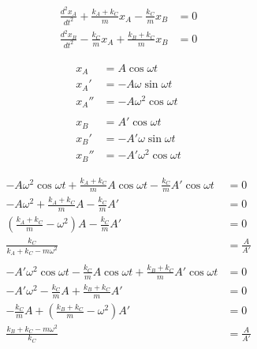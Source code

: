 \documentclass{article}
\begin{document}
\setcounter{subsection}{3}
\subsection{}

\begin{align*}
  \frac{d^2 x_A}{d t^2} + \frac{k_A + k_C}{m} x_A - \frac{k_C}{m} x_B & = 0 \\
  \frac{d^2 x_B}{d t^2} - \frac{k_C}{m} x_A + \frac{k_B + k_C}{m} x_B & = 0
\end{align*}

\begin{align*}
  x_A   & = A \cos \omega t            \\
  x_A'  & = -A \omega \sin \omega t    \\
  x_A'' & = -A \omega^2 \cos \omega t  \\ \\
  x_B   & = A' \cos \omega t           \\
  x_B'  & = -A' \omega \sin \omega t   \\
  x_B'' & = -A' \omega^2 \cos \omega t
\end{align*}

\begin{align*}
  -A \omega^2 \cos \omega t + \frac{k_A + k_C}{m} A \cos \omega t - \frac{k_C}{m} A' \cos \omega t  & = 0            \\
  -A \omega^2 + \frac{k_A + k_C}{m} A - \frac{k_C}{m} A'                                            & = 0            \\
  \left( \frac{k_A + k_C}{m} - \omega^2 \right) A - \frac{k_C}{m} A'                                & = 0            \\
  \frac{k_C}{k_A + k_C - m \omega^2}                                                                & = \frac{A}{A'} \\ \\
  -A' \omega^2 \cos \omega t - \frac{k_C}{m} A \cos \omega t + \frac{k_B + k_C}{m} A' \cos \omega t & = 0            \\
  -A' \omega^2 - \frac{k_C}{m} A + \frac{k_B + k_C}{m} A'                                           & = 0            \\
  -\frac{k_C}{m} A + \left( \frac{k_B + k_C}{m} - \omega^2 \right) A'                               & = 0            \\
  \frac{k_B + k_C - m \omega^2}{k_C}                                                                & = \frac{A}{A'}
\end{align*}
\end{document}
